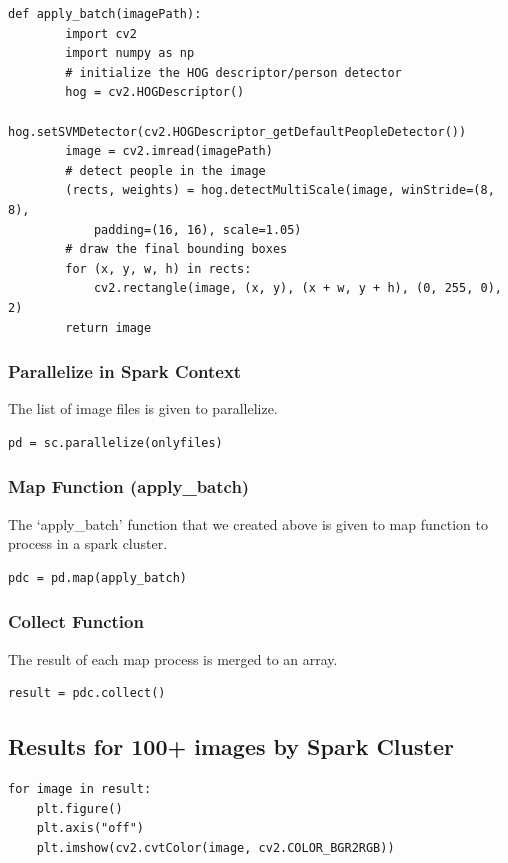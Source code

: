 \begin{lstlisting}
def apply_batch(imagePath):
        import cv2
        import numpy as np
        # initialize the HOG descriptor/person detector
        hog = cv2.HOGDescriptor()
        hog.setSVMDetector(cv2.HOGDescriptor_getDefaultPeopleDetector())
        image = cv2.imread(imagePath)
        # detect people in the image
        (rects, weights) = hog.detectMultiScale(image, winStride=(8, 8),
            padding=(16, 16), scale=1.05)
        # draw the final bounding boxes
        for (x, y, w, h) in rects:
            cv2.rectangle(image, (x, y), (x + w, y + h), (0, 255, 0), 2)
        return image
\end{lstlisting}

\subsubsection{Parallelize in Spark
Context}\label{parallelize-in-spark-context}

The list of image files is given to parallelize.

\begin{lstlisting}
pd = sc.parallelize(onlyfiles)
\end{lstlisting}

\subsubsection{Map Function
(apply\_batch)}\label{map-function-apply_batch}

The `apply\_batch' function that we created above is given to map
function to process in a spark cluster.

\begin{lstlisting}
pdc = pd.map(apply_batch)
\end{lstlisting}

\subsubsection{Collect Function}\label{collect-function}

The result of each map process is merged to an array.

\begin{lstlisting}
result = pdc.collect()
\end{lstlisting}

\subsection{Results for 100+ images by Spark
Cluster}\label{results-for-100-images-by-spark-cluster}

\begin{lstlisting}
for image in result:
    plt.figure()
    plt.axis("off")
    plt.imshow(cv2.cvtColor(image, cv2.COLOR_BGR2RGB))
\end{lstlisting}
